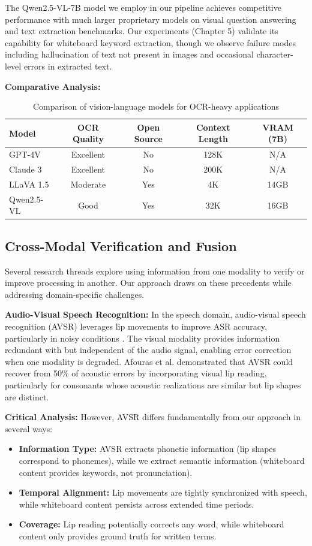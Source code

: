 The Qwen2.5-VL-7B model we employ in our pipeline achieves competitive performance with much larger proprietary models on visual question answering and text extraction benchmarks. Our experiments (Chapter 5) validate its capability for whiteboard keyword extraction, though we observe failure modes including hallucination of text not present in images and occasional character-level errors in extracted text.

\textbf{Comparative Analysis:}

\begin{table}[h]
\centering
\begin{tabular}{|l|c|c|c|c|}
\hline
\textbf{Model} & \textbf{OCR Quality} & \textbf{Open Source} & \textbf{Context Length} & \textbf{VRAM (7B)} \\
\hline
GPT-4V & Excellent & No & 128K & N/A \\
Claude 3 & Excellent & No & 200K & N/A \\
LLaVA 1.5 & Moderate & Yes & 4K & 14GB \\
Qwen2.5-VL & Good & Yes & 32K & 16GB \\
\hline
\end{tabular}
\caption{Comparison of vision-language models for OCR-heavy applications}
\end{table}

\subsection{Cross-Modal Verification and Fusion}

Several research threads explore using information from one modality to verify or improve processing in another. Our approach draws on these precedents while addressing domain-specific challenges.

\textbf{Audio-Visual Speech Recognition:} In the speech domain, audio-visual speech recognition (AVSR) leverages lip movements to improve ASR accuracy, particularly in noisy conditions \cite{Afouras2018}. The visual modality provides information redundant with but independent of the audio signal, enabling error correction when one modality is degraded. Afouras et al. demonstrated that AVSR could recover from 50\% of acoustic errors by incorporating visual lip reading, particularly for consonants whose acoustic realizations are similar but lip shapes are distinct.

\textbf{Critical Analysis:} However, AVSR differs fundamentally from our approach in several ways:
\begin{itemize}
    \item \textbf{Information Type:} AVSR extracts phonetic information (lip shapes correspond to phonemes), while we extract semantic information (whiteboard content provides keywords, not pronunciation).
    \item \textbf{Temporal Alignment:} Lip movements are tightly synchronized with speech, while whiteboard content persists across extended time periods.
    \item \textbf{Coverage:} Lip reading potentially corrects any word, while whiteboard content only provides ground truth for written terms.
\end{itemize}

